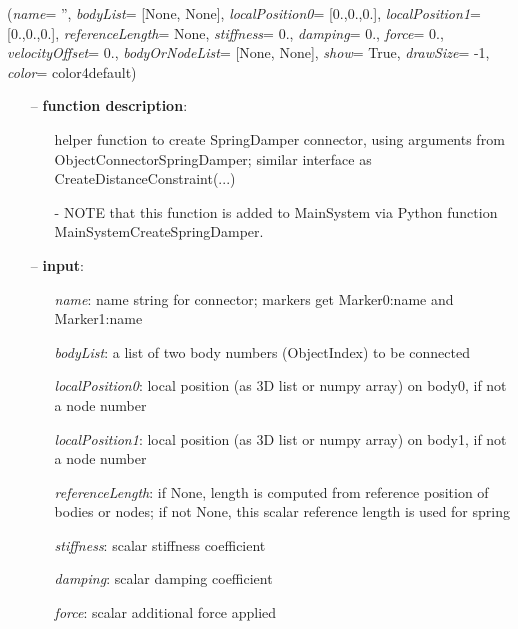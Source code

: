 %
\begin{flushleft}
\label{sec:mainsystemextensions:CreateSpringDamper}
({\it name}= '', {\it bodyList}= [None, None], {\it localPosition0}= [0.,0.,0.], {\it localPosition1}= [0.,0.,0.], {\it referenceLength}= None, {\it stiffness}= 0., {\it damping}= 0., {\it force}= 0., {\it velocityOffset}= 0., {\it bodyOrNodeList}= [None, None], {\it show}= True, {\it drawSize}= -1, {\it color}= color4default)
\end{flushleft}
\setlength{\itemindent}{0.7cm}
\begin{itemize}[leftmargin=0.7cm]
\item[--]
{\bf function description}: \vspace{-6pt}
\begin{itemize}[leftmargin=1.2cm]
\setlength{\itemindent}{-0.7cm}
\item[]helper function to create SpringDamper connector, using arguments from ObjectConnectorSpringDamper; similar interface as CreateDistanceConstraint(...)
\item[]- NOTE that this function is added to MainSystem via Python function MainSystemCreateSpringDamper.
\end{itemize}
\item[--]
{\bf input}: \vspace{-6pt}
\begin{itemize}[leftmargin=1.2cm]
\setlength{\itemindent}{-0.7cm}
\item[]{\it name}: name string for connector; markers get Marker0:name and Marker1:name
\item[]{\it bodyList}: a list of two body numbers (ObjectIndex) to be connected
\item[]{\it localPosition0}: local position (as 3D list or numpy array) on body0, if not a node number
\item[]{\it localPosition1}: local position (as 3D list or numpy array) on body1, if not a node number
\item[]{\it referenceLength}: if None, length is computed from reference position of bodies or nodes; if not None, this scalar reference length is used for spring
\item[]{\it stiffness}: scalar stiffness coefficient
\item[]{\it damping}: scalar damping coefficient
\item[]{\it force}: scalar additional force applied

\end{itemize}
\end{itemize}
